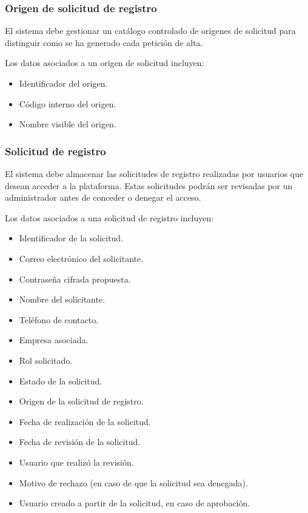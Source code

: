 \subsubsection*{Origen de solicitud de registro}

El sistema debe gestionar un catálogo controlado de origenes de solicitud para distinguir como se ha generado cada petición de alta.

Los datos asociados a un origen de solicitud incluyen:

\begin{itemize}
    \item Identificador del origen.
    \item Código interno del origen.
    \item Nombre visible del origen.
\end{itemize}

\subsubsection*{Solicitud de registro}

El sistema debe almacenar las solicitudes de registro realizadas por usuarios
que desean acceder a la plataforma. Estas solicitudes podrán ser revisadas por
un administrador antes de conceder o denegar el acceso.

Los datos asociados a una solicitud de registro incluyen:

\begin{itemize}
    \item Identificador de la solicitud.
    \item Correo electrónico del solicitante.
    \item Contraseña cifrada propuesta.
    \item Nombre del solicitante.
    \item Teléfono de contacto.
    \item Empresa asociada.
    \item Rol solicitado.
    \item Estado de la solicitud.
    \item Origen de la solicitud de registro.
    \item Fecha de realización de la solicitud.
    \item Fecha de revisión de la solicitud.
    \item Usuario que realizó la revisión.
    \item Motivo de rechazo (en caso de que la solicitud sea denegada).
    \item Usuario creado a partir de la solicitud, en caso de aprobación.
\end{itemize}

